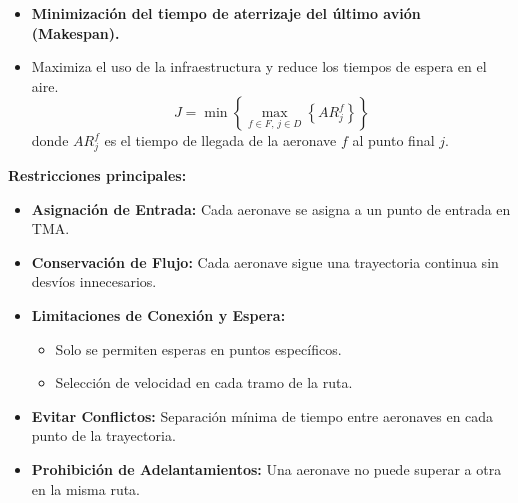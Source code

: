\begin{frame}{\parencite{2024_Yi_Zhang} }{}
    \begin{itemize}
        \item \textbf{Minimización del tiempo de aterrizaje del último avión (Makespan).}
        \item Maximiza el uso de la infraestructura y reduce los tiempos de espera en el aire.
              \[
                  J = \min \left\{\max_{f \in F,\, j \in D} \left\{AR^f_j\right\}\right\}
              \]
              donde \(AR^f_j\) es el tiempo de llegada de la aeronave \(f\) al punto final \(j\).
    \end{itemize}
\end{frame}

\begin{frame}{\parencite{2024_Yi_Zhang} }{}
    \textbf{Restricciones principales:}
    \begin{itemize}
        \item \textbf{Asignación de Entrada:} Cada aeronave se asigna a un punto de entrada en TMA.
        \item \textbf{Conservación de Flujo:} Cada aeronave sigue una trayectoria continua sin desvíos innecesarios.
        \item \textbf{Limitaciones de Conexión y Espera:}
              \begin{itemize}
                  \item Solo se permiten esperas en puntos específicos.
                  \item Selección de velocidad en cada tramo de la ruta.
              \end{itemize}
        \item \textbf{Evitar Conflictos:} Separación mínima de tiempo entre aeronaves en cada punto de la trayectoria.
        \item \textbf{Prohibición de Adelantamientos:} Una aeronave no puede superar a otra en la misma ruta.
    \end{itemize}
\end{frame}



